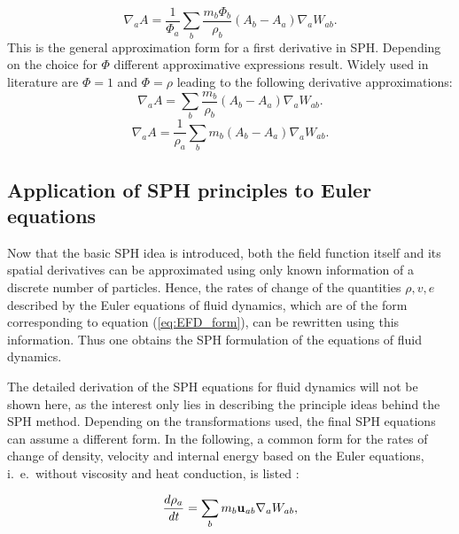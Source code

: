 \documentclass{report}
\begin{document}
\begin{equation}
\label{eq:genFirstDerivativeSPH_Approximation}
\nabla_a A = \frac{1}{\Phi_a}\sum_b \frac{m_b \Phi_b}{\rho_b}(A_b-A_a)\nabla_a W_{ab}.
\end{equation}
This is the general approximation form for a first derivative in SPH. Depending on the choice for $\Phi$ different approximative expressions result. Widely used in literature are $\Phi=1$ and $\Phi=\rho$ leading to the following derivative approximations:
\begin{equation}
\label{eq:genFirstDerivativeSPH_Approximation_Phi_1}
\nabla_a A = \sum_b \frac{m_b}{\rho_b}(A_b-A_a)\nabla_a W_{ab}.
\end{equation}
\begin{equation}
\label{eq:genFirstDerivativeSPH_Approximation_Phi_rho}
\nabla_a A = \frac{1}{\rho_a}\sum_b m_b (A_b-A_a)\nabla_a W_{ab}.
\end{equation}

\subsection{Application of SPH principles to Euler equations}

Now that the basic SPH idea is introduced, both the field function
itself and its spatial derivatives can be approximated using only known information of a discrete number of particles. Hence, the rates of change of
the quantities $\rho,v, e$ described by the Euler equations of fluid dynamics, which are of the form
corresponding to equation (\ref{eq:EFD_form}), can be rewritten using this information. Thus 
one obtains the SPH formulation of the equations of fluid dynamics.

The detailed derivation of the SPH equations for fluid dynamics will not be shown here, as the interest  only lies in describing the principle ideas behind the SPH
method. Depending on the transformations used, the final SPH equations can assume a different form. In the following, a common form for the rates of change of density, velocity and
internal energy based on the Euler equations, i.\ e.\ without viscosity and heat conduction, is listed \cite{Monaghan2005,Liu2003}: 

\begin{equation}
\label{eq:DCR_Euler}
\frac{d\rho _a}{\mathit{dt}}=\sum_b{m_{b}{\bf u_{\mathit{ab}}}\nabla _{a}W_{\mathit{ab}}},
\end{equation}
\end{document}

